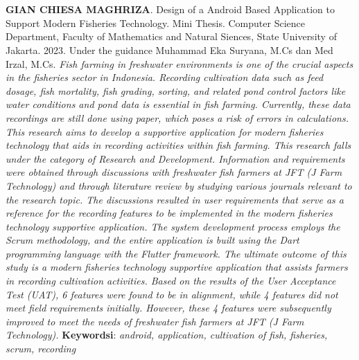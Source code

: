 \chapter*{}

\begin{spacing}{1}
\textbf{GIAN CHIESA MAGHRIZA}. Design of a Android Based Application to Support Modern Fisheries Technology. Mini Thesis. Computer Science Department, Faculty of Mathematics and Natural Siences, State University of Jakarta. 2023. Under the guidance Muhammad Eka Suryana, M.Cs dan Med Irzal, M.Cs.
\newline
\newline
\textit{Fish farming in freshwater environments is one of the crucial aspects in the fisheries sector in Indonesia. Recording cultivation data such as feed dosage, fish mortality, fish grading, sorting, and related pond control factors like water conditions and pond data is essential in fish farming. Currently, these data recordings are still done using paper, which poses a risk of errors in calculations. This research aims to develop a supportive application for modern fisheries technology that aids in recording activities within fish farming. This research falls under the category of Research and Development. Information and requirements were obtained through discussions with freshwater fish farmers at JFT (J Farm Technology) and through literature review by studying various journals relevant to the research topic. The discussions resulted in user requirements that serve as a reference for the recording features to be implemented in the modern fisheries technology supportive application. The system development process employs the Scrum methodology, and the entire application is built using the Dart programming language with the Flutter framework. The ultimate outcome of this study is a modern fisheries technology supportive application that assists farmers in recording cultivation activities. Based on the results of the User Acceptance Test (UAT), 6 features were found to be in alignment, while 4 features did not meet field requirements initially. However, these 4 features were subsequently improved to meet the needs of freshwater fish farmers at JFT (J Farm Technology).}
\newline
\newline
\noindent \textbf{Keywordsi}: \textit{android, application, cultivation of fish, fisheries, scrum, recording}
\end{spacing}